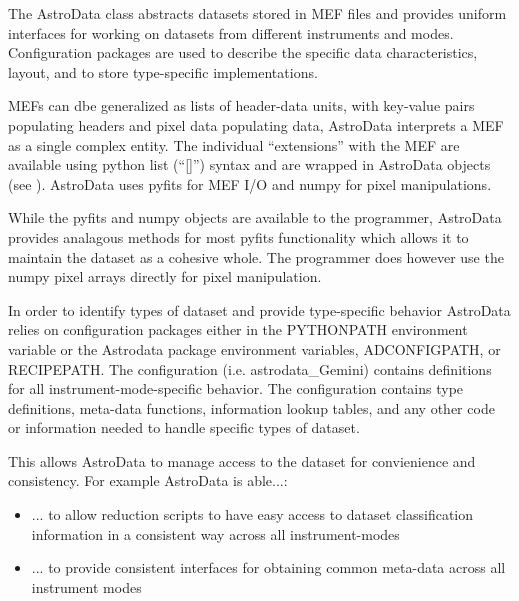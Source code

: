 \documentclass[letterpaper,10pt,english]{sphinxmanual}
\begin{document}
\begin{fulllineitems}
\label{chapter_AstroDataClass:astrodata.data.AstroData}
The AstroData class abstracts datasets stored in MEF files
and provides uniform interfaces for working on datasets from different
instruments and modes.  Configuration packages are used to describe
the specific data characteristics, layout, and to store type-specific
implementations.

MEFs can dbe generalized as lists of header-data units, with key-value 
pairs populating headers and pixel data populating data,
AstroData interprets a MEF as a single complex entity.  The individual
``extensions'' with the MEF are available using python list (``{[}{]}'') syntax and are 
wrapped in AstroData objects (see 
{\hyperref[chapter_AstroDataClass:astrodata.data.AstroData.__getitem__]{}}). AstroData uses 
pyfits for MEF I/O and numpy for pixel manipulations.

While the pyfits and numpy objects are available to the programmer, AstroData
provides analagous methods for most pyfits functionality which allows it to
maintain the dataset  as a cohesive whole. The programmer does however use the
numpy pixel arrays directly for pixel manipulation.

In order to identify types of dataset and provide type-specific behavior
AstroData relies on configuration packages either in the PYTHONPATH environment
variable or the Astrodata package environment variables, ADCONFIGPATH, or
RECIPEPATH. The configuration (i.e. astrodata\_Gemini) contains definitions for
all  instrument-mode-specific behavior. The configuration contains type
definitions, meta-data functions, information lookup tables, and any other code
or information needed to handle specific types of dataset.

This allows AstroData to manage access to the dataset for convienience and
consistency.
For example AstroData is able...:
\begin{itemize}
\item {} 
... to allow reduction scripts to have easy access to dataset classification 
information in a consistent way across all instrument-modes

\item {} 
... to provide consistent interfaces for obtaining common meta-data across all
instrument modes


\end{itemize}
\end{fulllineitems}
\end{document}

